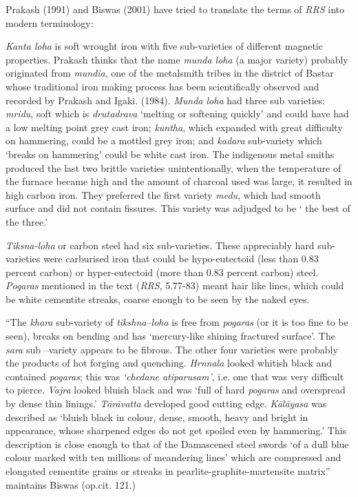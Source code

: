 Prakash (1991) and Biswas (2001) have tried to translate the terms of {\it RRS} into modern terminology:

{\it Kanta loha} is soft wrought iron with five sub-varieties of different magnetic properties. Prakash thinks that the name {\it munda loha} (a major variety) probably originated from {\it mundia}, one of the metalsmith tribes in the district of Bastar whose traditional iron making process has been scientifically observed and recorded by Prakash and Igaki. (1984). {\it Munda loha} had three sub varieties: {\it mridu}, soft which is {\it drutadrava} ‘melting or softening quickly’ and could have had a low melting point grey cast iron; {\it kuntha}, which expanded with great difficulty on hammering, could be a mottled grey iron; and {\it kadara} sub-variety which ‘breaks on hammering’ could be white cast iron. The indigenous metal smiths produced the last two brittle varieties unintentionally, when the temperature of the furnace became high and the amount of charcoal used was large, it resulted in high carbon iron. They preferred the first variety {\it medu}, which had smooth surface and did not contain fissures. This variety was adjudged to be ‘ the best of the three.’

{\it Tiksna-loha} or carbon steel had six sub-varieties. These appreciably hard sub-varieties were carburised iron that could be hypo-eutectoid (less than 0.83 percent carbon) or hyper-eutectoid (more than 0.83 percent carbon) steel. {\it Pogaras} mentioned in the text ({\it RRS}, 5.77-83) meant hair like lines, which could be white cementite streaks, coarse enough to be seen by the naked eyes.

{\footnotesize{“The {\it khara} sub-variety of {\it tikshna–loha} is free from {\it pogaras} (or it is too fine to be seen), breaks on bending and has ‘mercury-like shining fractured surface’. The {\it sara} sub –variety appears to be fibrous. The other four varieties were probably the products of hot forging and quenching. {\it Hrnnala} looked whitish black and contained {\it pogaras}; this was {\it `chedane atiparusam'}, i.e. one that was very difficult to pierce. {\it Vajra} looked bluish black and was ‘full of hard {\it pogaras} and overspread by dense thin linings.’ {\it Tārāvatta} developed good cutting edge. {\it Kālāyasa} was described as ‘bluish black in colour, dense, smooth, heavy and bright in appearance, whose sharpened edges do not get spoiled even by hammering.’ This description is close enough to that of the Damascened steel swords ‘of a dull blue colour marked with ten millions of meandering lines’ which are compressed and elongated cementite grains or streaks in pearlite-graphite-martensite matrix”}} maintains Biswas (op.cit. 121.)

